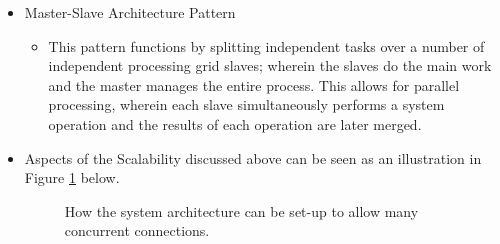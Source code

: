 \begin{enumerate}
			 \begin{itemize}
			\item Master-Slave Architecture Pattern
				\begin{itemize}
					\item This pattern functions by splitting independent tasks over a number of independent processing grid slaves; wherein the slaves do the main work and the master manages the entire process. This allows for parallel processing, wherein each slave simultaneously performs a system operation and the results of each operation are later merged.
				 \end{itemize}
			 \end{itemize} 
		\end{enumerate}
		
		
\pagebreak	
\begin{itemize}
	\item Aspects of the Scalability discussed above can be seen as an illustration in Figure \ref{fig:scalability} below.
	\begin{figure}[H]
		\centering
		\caption{How the system architecture can be set-up to allow many concurrent connections.}
		\label{fig:scalability}
	\end{figure}
\end{itemize}